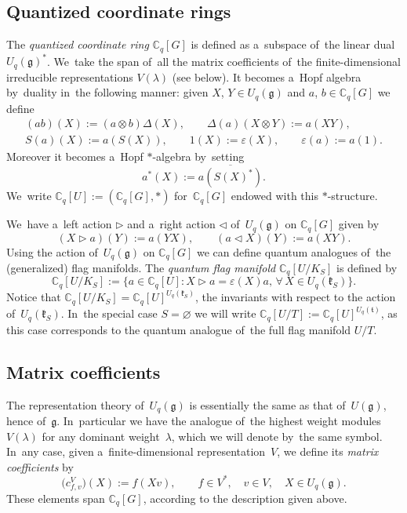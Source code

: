 \documentclass[pdftex]{sigma}
\numberwithin{equation}{section}
\newcommand{\lieg}{\mathfrak{g}}
\newcommand{\Uqg}{U_q(\mathfrak{g})}
\newcommand{\Uqt}{U_q(\mathfrak{t})}
\newcommand{\UqkS}{U_q(\mathfrak{k}_S)}
\newcommand{\CqG}{\mathbb{C}_q[G]}
\newcommand{\CqU}{\mathbb{C}_q[U]}
\newcommand{\Cqflag}{\mathbb{C}_q[U / K_S]}
\newcommand{\Cqfullflag}{\mathbb{C}_q[U /T]}
\begin{document}
\subsection{Quantized coordinate rings}

The \emph{quantized coordinate ring} $\CqG$ is defined as a~subspace of~the linear dual $\Uqg^*$.
We~take the span of~all the matrix coefficients of~the finite-dimensional irreducible representations $V(\lambda)$ (see below).
It becomes a~Hopf algebra by~duality in~the following manner: given $X$, $Y \in \Uqg$ and $a$, $b \in \CqG$ we define
\begin{gather*}
(a b)(X) := (a \otimes b) \Delta(X), \qquad
\Delta(a) (X \otimes Y) := a(X Y),
\\
S(a)(X) := a(S(X)), \qquad
1(X) := \varepsilon(X), \qquad
\varepsilon(a) := a(1).
\end{gather*}
Moreover it becomes a~Hopf $*$-algebra by~setting
\[
a^*(X) := \overline{a(S(X)^*)}.
\]
We~write $\CqU := (\CqG, *)$ for~$\CqG$ endowed with this $*$-structure.

We~have a~left action $\triangleright$ and a~right action $\triangleleft$ of~$\Uqg$ on $\CqG$ given by \[
(X \triangleright a)(Y) := a(Y X), \qquad
(a \triangleleft X)(Y) := a(X Y).
\]
Using the action of~$\Uqg$ on $\CqG$ we can define quantum analogues of~the (generalized) flag manifolds.
The \emph{quantum flag manifold} $\Cqflag$ is defined by
\[
\Cqflag := \{ a\in \CqU\colon X \triangleright a = \varepsilon(X) a, \, \forall\, X \in \UqkS \}.
\]
Notice that $\Cqflag = \CqU^{\UqkS}$, the invariants with respect to the action of~$\UqkS$.
In~the special case $S = \varnothing$ we will write $\Cqfullflag := \CqU^{\Uqt}$, as this case corresponds to the quantum analogue of~the full flag manifold $U / T$.

\subsection{Matrix coefficients}\label{sec:mat-coeff}

The representation theory of~$\Uqg$ is essentially the same as that of~$U(\lieg)$, hence of~$\lieg$.
In~particular we have the analogue of~the highest weight modules~$V(\lambda)$ for any dominant weight~$\lambda$, which we will denote by~the same symbol.
In~any case, given a~finite-dimensional representa\-tion~$V$, we define its \emph{matrix coefficients} by
\[
\big(c^V_{f, v}\big)(X) := f(X v), \qquad f \in V^*, \quad v \in V, \quad X \in \Uqg.
\]
These elements span $\CqG$, according to the description given above.
\end{document}
